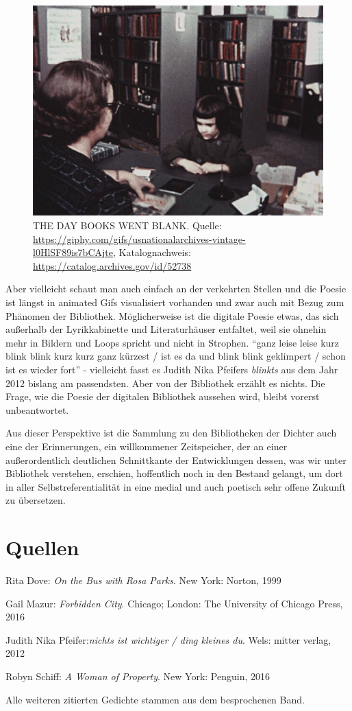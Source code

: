 \documentclass[a4paper,
fontsize=11pt,
oneside,
numbers=noperiodatend,
parskip=half-,
bibliography=totoc,
final
]{scrartcl}
\begin{document}
\begin{figure}
\centering
\includegraphics{img/abbildung.png}
\caption{THE DAY BOOKS WENT BLANK. Quelle:
\url{https://giphy.com/gifs/usnationalarchives-vintage-l0HlSF89is7bCAjte},
Katalognachweis: \url{https://catalog.archives.gov/id/52738}}
\end{figure}

Aber vielleicht schaut man auch einfach an der verkehrten Stellen und
die Poesie ist längst in animated Gifs visualisiert vorhanden und zwar
auch mit Bezug zum Phänomen der Bibliothek. Möglicherweise ist die
digitale Poesie etwas, das sich außerhalb der Lyrikkabinette und
Literaturhäuser entfaltet, weil sie ohnehin mehr in Bildern und Loops
spricht und nicht in Strophen. \enquote{ganz leise leise kurz blink
blink kurz kurz ganz kürzest / ist es da und blink blink geklimpert /
schon ist es wieder fort} - vielleicht fasst es Judith Nika Pfeifers
\emph{blinkts} aus dem Jahr 2012 bislang am passendsten. Aber von der
Bibliothek erzählt es nichts. Die Frage, wie die Poesie der digitalen
Bibliothek aussehen wird, bleibt vorerst unbeantwortet.

Aus dieser Perspektive ist die Sammlung zu den Bibliotheken der Dichter
auch eine der Erinnerungen, ein willkommener Zeitspeicher, der an einer
außerordentlich deutlichen Schnittkante der Entwicklungen dessen, was
wir unter Bibliothek verstehen, erschien, hoffentlich noch in den
Bestand gelangt, um dort in aller Selbstreferentialität in eine medial
und auch poetisch sehr offene Zukunft zu übersetzen.

\section*{Quellen}\label{quellen}

Rita Dove: \emph{On the Bus with Rosa Parks}. New York: Norton, 1999

Gail Mazur: \emph{Forbidden City}. Chicago; London: The University of
Chicago Press, 2016

Judith Nika Pfeifer:\emph{nichts ist wichtiger / ding kleines du}. Wels:
mitter verlag, 2012

Robyn Schiff: \emph{A Woman of Property}. New York: Penguin, 2016

Alle weiteren zitierten Gedichte stammen aus dem besprochenen Band.

\end{document}
